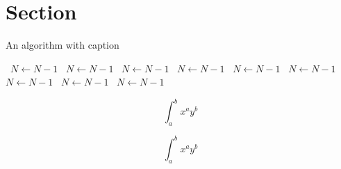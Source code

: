 \documentclass[a4paper]{article}
\begin{document}
\section{Section}

\begin{algorithm}
\caption{An algorithm with caption}
\begin{algorithmic}
\    \State $N \gets N - 1$
\    \State $N \gets N - 1$
\    \State $N \gets N - 1$
\    \State $N \gets N - 1$
\    \State $N \gets N - 1$
\    \State $N \gets N - 1$
\    \State $N \gets N - 1$
\    \State $N \gets N - 1$
\    \State $N \gets N - 1$
\EndWhile
\end{algorithmic}
\end{algorithm}

\[ \int_{a}^{b}{x^{a}y^{b}} \]

\[ \int_{a}^{b}{x^{a}y^{b}} \]
\end{document}

